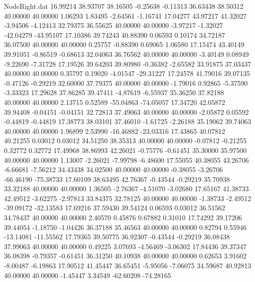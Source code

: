 \begin{filecontents}{NodeRight.dat}
  16.99214   38.93707   38.16505    -0.25638   -0.11313   36.63438   38.50312   40.00000   40.00000    1.06293    1.83495   -2.64561   -1.16741
  17.04277   43.97217   41.32027    -3.94506   -4.12413   32.79375   36.55625   40.00000   40.00000   -3.97217   -1.32027  -42.04279  -43.95107
  17.10386   39.74243   40.88390     0.06593    0.10174   34.72187   36.07500   40.00000   40.00000    0.25757   -0.88390    0.69065    1.06580
  17.15474   43.40149   39.91051    -0.86519   -0.68613   32.04063   36.76562   40.00000   40.00000   -3.40149    0.08949   -9.22690   -7.31728
  17.19526   39.64203   39.80980    -0.36382   -2.65582   33.91875   37.03437   40.00000   40.00000    0.35797    0.19020   -4.01547  -29.31227
  17.24578   41.79016   39.07135    -0.47126   -0.29219   32.60000   37.79375   40.00000   40.00000   -1.79016    0.92865   -5.37590   -3.33323
  17.29628   37.86285   39.47411    -4.87619   -6.55937   35.36250   37.82188   40.00000   40.00000    2.13715    0.52589  -55.04863  -74.05057
  17.34720   42.05872   39.94408    -0.04151   -0.04151   32.72813   37.49063   40.00000   40.00000   -2.05872    0.05592   -0.44819   -0.44819
  17.38773   38.03101   37.46010    -1.61725   -2.26188   35.19062   39.74063   40.00000   40.00000    1.96899    2.53990  -16.46882  -23.03316
  17.43865   40.07812   40.21255     0.03012    0.03012   34.51250   38.35313   40.00000   40.00000   -0.07812   -0.21255    0.32772    0.32772
  17.49968   38.86993   42.26021    -0.75776   -0.61451   35.30000   35.97500   40.00000   40.00000    1.13007   -2.26021   -7.99798   -6.48600
  17.55055   40.38055   43.26706    -6.66681   -7.56212   34.43438   34.02500   40.00000   40.00000   -0.38055   -3.26706  -66.46190  -75.38733
  17.60109   38.63495   42.76367    -0.43544   -0.29219   35.70938   33.32188   40.00000   40.00000    1.36505   -2.76367   -4.51070   -3.02680
  17.65167   41.38733   42.49512    -3.62275   -2.97813   33.84375   32.78125   40.00000   40.00000   -1.38733   -2.49512  -39.09172  -32.13583
  17.69216   37.59430   39.54124     0.06593    0.03012   36.51562   34.78437   40.00000   40.00000    2.40570    0.45876    0.67882    0.31010
  17.74292   39.17206   39.44054    -1.18750   -1.04426   36.37188   35.46563   40.00000   40.00000    0.82794    0.55946  -13.14081  -11.55562
  17.79365   39.50775   36.92307    -0.43544   -0.29219   36.08438   37.99063   40.00000   40.00000    0.49225    3.07693   -4.56469   -3.06302
  17.84436   39.37347   36.08398    -0.79357   -0.61451   36.31250   40.10938   40.00000   40.00000    0.62653    3.91602   -8.00487   -6.19863
  17.90512   41.45447   36.65451    -5.95056   -7.06075   34.59687   40.92813   40.00000   40.00000   -1.45447    3.34549  -62.60208  -74.28165

\end{filecontents}
